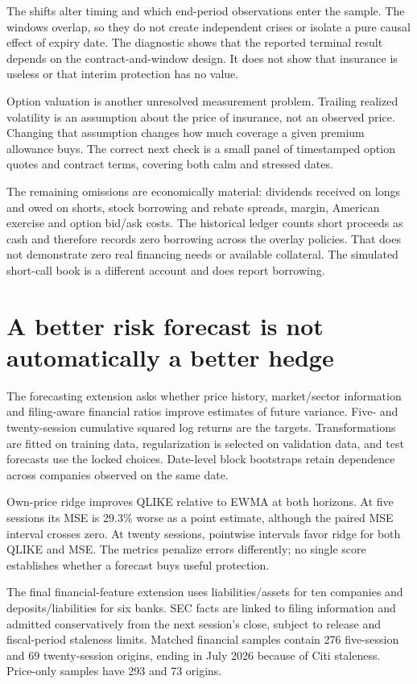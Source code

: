 \documentclass[11pt,a4paper]{article}
\begin{document}
The shifts alter timing and which end-period observations enter the sample. The windows overlap, so they do not create independent crises or isolate a pure causal effect of expiry date. The diagnostic shows that the reported terminal result depends on the contract-and-window design. It does not show that insurance is useless or that interim protection has no value.

Option valuation is another unresolved measurement problem. Trailing realized volatility is an assumption about the price of insurance, not an observed price. Changing that assumption changes how much coverage a given premium allowance buys. The correct next check is a small panel of timestamped option quotes and contract terms, covering both calm and stressed dates.

The remaining omissions are economically material: dividends received on longs and owed on shorts, stock borrowing and rebate spreads, margin, American exercise and option bid/ask costs. The historical ledger counts short proceeds as cash and therefore records zero borrowing across the overlay policies. That does not demonstrate zero real financing needs or available collateral. The simulated short-call book is a different account and does report borrowing.

\nextpage
\section*{A better risk forecast is not automatically a better hedge}
The forecasting extension asks whether price history, market/sector information and filing-aware financial ratios improve estimates of future variance. Five- and twenty-session cumulative squared log returns are the targets. Transformations are fitted on training data, regularization is selected on validation data, and test forecasts use the locked choices. Date-level block bootstraps retain dependence across companies observed on the same date.

Own-price ridge improves QLIKE relative to EWMA at both horizons. At five sessions its MSE is 29.3\% worse as a point estimate, although the paired MSE interval crosses zero. At twenty sessions, pointwise intervals favor ridge for both QLIKE and MSE. The metrics penalize errors differently; no single score establishes whether a forecast buys useful protection.

The final financial-feature extension uses liabilities/assets for ten companies and deposits/liabilities for six banks. SEC facts are linked to filing information and admitted conservatively from the next session's close, subject to release and fiscal-period staleness limits. Matched financial samples contain 276 five-session and 69 twenty-session origins, ending in July 2026 because of Citi staleness. Price-only samples have 293 and 73 origins.
\end{document}
